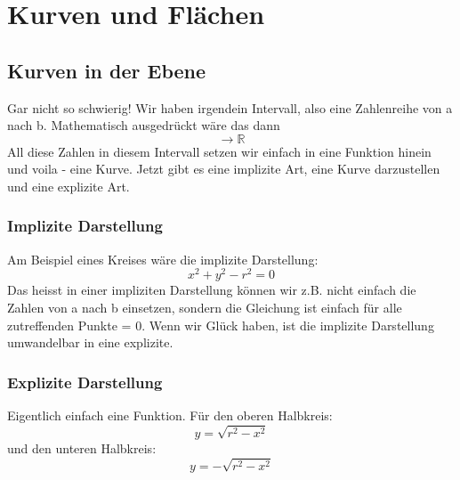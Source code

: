\chapter{Kurven und Flächen}

\section{Kurven in der Ebene}
Gar nicht so schwierig! Wir haben irgendein Intervall, also eine Zahlenreihe von a nach b. Mathematisch ausgedrückt wäre das dann
\begin{displaymath}
[a,b]\rightarrow\mathbb{R}
\end{displaymath}
All diese Zahlen in diesem Intervall setzen wir einfach in eine Funktion hinein und voila - eine Kurve. Jetzt gibt es eine implizite Art, eine Kurve darzustellen und eine explizite Art.
\subsection{Implizite Darstellung}
Am Beispiel eines Kreises wäre die implizite Darstellung:
\begin{displaymath}
x^2 + y^2 - r^2 = 0
\end{displaymath}
Das heisst in einer impliziten Darstellung können wir z.B. nicht einfach die Zahlen von a nach b einsetzen, sondern die Gleichung ist einfach für alle zutreffenden Punkte = 0. Wenn wir Glück haben, ist die implizite Darstellung umwandelbar in eine explizite.
\subsection{Explizite Darstellung}
Eigentlich einfach eine Funktion.
Für den oberen Halbkreis:
\begin{displaymath}
y = \sqrt{r^2-x^2}
\end{displaymath}
und den unteren Halbkreis:
\begin{displaymath}
y = -\sqrt{r^2-x^2}
\end{displaymath}
